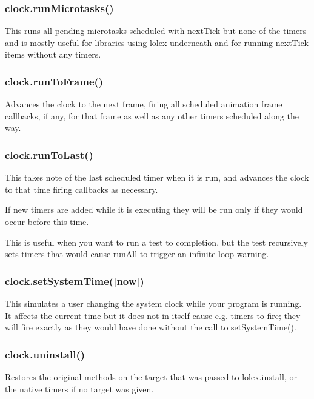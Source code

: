 \subsubsection*{{\ttfamily clock.\+run\+Microtasks()}}

This runs all pending microtasks scheduled with {\ttfamily next\+Tick} but none of the timers and is mostly useful for libraries using lolex underneath and for running {\ttfamily next\+Tick} items without any timers.

\subsubsection*{{\ttfamily clock.\+run\+To\+Frame()}}

Advances the clock to the next frame, firing all scheduled animation frame callbacks, if any, for that frame as well as any other timers scheduled along the way.

\subsubsection*{{\ttfamily clock.\+run\+To\+Last()}}

This takes note of the last scheduled timer when it is run, and advances the clock to that time firing callbacks as necessary.

If new timers are added while it is executing they will be run only if they would occur before this time.

This is useful when you want to run a test to completion, but the test recursively sets timers that would cause {\ttfamily run\+All} to trigger an infinite loop warning.

\subsubsection*{{\ttfamily clock.\+set\+System\+Time(\mbox{[}now\mbox{]})}}

This simulates a user changing the system clock while your program is running. It affects the current time but it does not in itself cause e.\+g. timers to fire; they will fire exactly as they would have done without the call to set\+System\+Time().

\subsubsection*{{\ttfamily clock.\+uninstall()}}

Restores the original methods on the {\ttfamily target} that was passed to {\ttfamily lolex.\+install}, or the native timers if no {\ttfamily target} was given.

